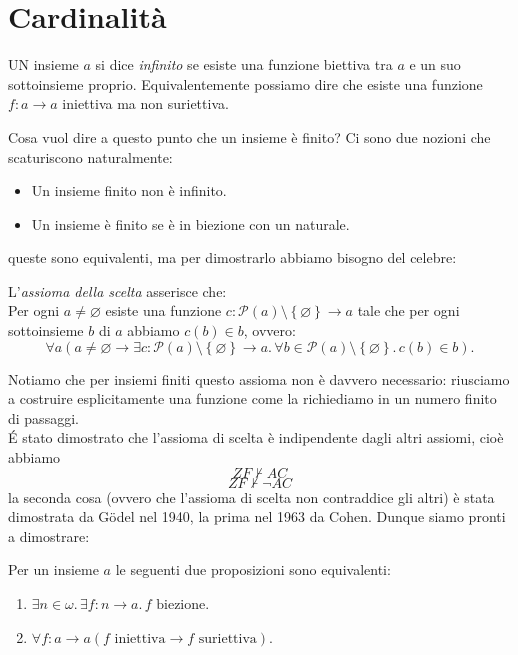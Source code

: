 \documentclass[11pt]{scrartcl}
\newcommand{\eset}{\varnothing}
\newcommand{\parti}[1]{\mathcal{P}\!\left(#1\right)}
\begin{document}
 	\newpage
 	
 	\section{Cardinalità}
 	\begin{definition}
 		UN insieme $a$ si dice \textit{infinito} se esiste una funzione biettiva tra $a$ e un suo sottoinsieme proprio. Equivalentemente possiamo dire che esiste una funzione $f:a\to a$ iniettiva ma non suriettiva.
 	\end{definition}
 	Cosa vuol dire a questo punto che un insieme è finito? Ci sono due nozioni che scaturiscono naturalmente:
 	\begin{itemize}
 		\item Un insieme finito non è infinito.
 		\item Un insieme è finito se è in biezione con un naturale.
 	\end{itemize}
 	queste sono equivalenti, ma per dimostrarlo abbiamo bisogno del celebre:
 	\begin{definition}
 		L'\textit{assioma della scelta} asserisce che: \\
 		Per ogni $a\ne \eset$ esiste una funzione $c:\parti{a}\setminus \left\{\eset\right\}\to a$ tale che per ogni sottoinsieme $b$ di $a$ abbiamo $c(b)\in b$, ovvero:
 		$$\forall a(a\ne \eset \to \exists c:\parti{a}\setminus \left\{\eset\right\}\to a .\, \forall b\in \parti{a}\setminus\left\{\eset\right\}.\,c(b)\in b).$$
 	\end{definition}
 	Notiamo che per insiemi finiti questo assioma non è davvero necessario: riusciamo a costruire esplicitamente una funzione come la richiediamo in un numero finito di passaggi. \\
 	\'E stato dimostrato che l'assioma di scelta è indipendente dagli altri assiomi, cioè abbiamo
 	$$ZF\not\vdash AC$$
 	$$ZF\not\vdash 	\lnot AC$$
 	la seconda cosa (ovvero che l'assioma di scelta non contraddice gli altri) è stata dimostrata da G{\"o}del nel 1940, la prima nel 1963 da Cohen. Dunque siamo pronti a dimostrare:
 	\begin{proposition}
 		Per un insieme $a$ le seguenti due proposizioni sono equivalenti:
 		\begin{enumerate}
 			\item $\exists n\in \omega.\,\exists f:n\to a.\,f\text{ biezione}$.
 			\item $\forall f:a\to a(f\text{ iniettiva}\to f\text{ suriettiva})$.
 		\end{enumerate}
 	\end{proposition}
\end{document}
